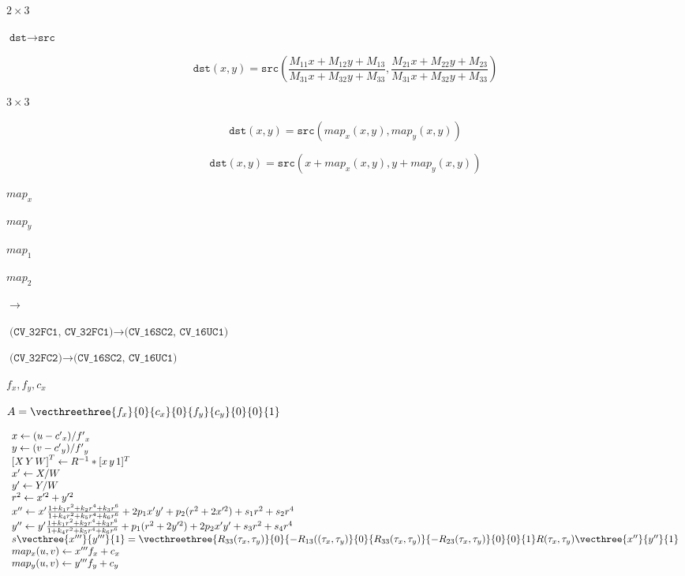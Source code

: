 \documentclass{article}
\begin{document}
$2\times 3$
\pagebreak

$\texttt{dst}\rightarrow\texttt{src}$
\pagebreak

\[\texttt{dst} (x,y) =  \texttt{src} \left ( \frac{M_{11} x + M_{12} y + M_{13}}{M_{31} x + M_{32} y + M_{33}} ,
     \frac{M_{21} x + M_{22} y + M_{23}}{M_{31} x + M_{32} y + M_{33}} \right )\]
\pagebreak

$3\times 3$
\pagebreak

\[\texttt{dst} (x,y) =  \texttt{src} (map_x(x,y),map_y(x,y))\]
\pagebreak

\[\texttt{dst} (x,y) =  \texttt{src} (x+map_x(x,y),y+map_y(x,y))\]
\pagebreak

$map_x$
\pagebreak

$map_y$
\pagebreak

$map_1$
\pagebreak

$map_2$
\pagebreak

$\rightarrow$
\pagebreak

$\texttt{(CV_32FC1, CV_32FC1)} \rightarrow \texttt{(CV_16SC2, CV_16UC1)}$
\pagebreak

$\texttt{(CV_32FC2)} \rightarrow \texttt{(CV_16SC2, CV_16UC1)}$
\pagebreak

$f_x,
f_y, c_x$
\pagebreak

$A = \vecthreethree{f_x}{0}{c_x}{0}{f_y}{c_y}{0}{0}{1}$
\pagebreak

\[\begin{array}{l}
x  \leftarrow (u - {c'}_x)/{f'}_x  \\
y  \leftarrow (v - {c'}_y)/{f'}_y  \\
{[X\,Y\,W]} ^T  \leftarrow R^{-1}*[x \, y \, 1]^T  \\
x'  \leftarrow X/W  \\
y'  \leftarrow Y/W  \\
r^2  \leftarrow x'^2 + y'^2 \\
x''  \leftarrow x' \frac{1 + k_1 r^2 + k_2 r^4 + k_3 r^6}{1 + k_4 r^2 + k_5 r^4 + k_6 r^6}
+ 2p_1 x' y' + p_2(r^2 + 2 x'^2)  + s_1 r^2 + s_2 r^4\\
y''  \leftarrow y' \frac{1 + k_1 r^2 + k_2 r^4 + k_3 r^6}{1 + k_4 r^2 + k_5 r^4 + k_6 r^6}
+ p_1 (r^2 + 2 y'^2) + 2 p_2 x' y' + s_3 r^2 + s_4 r^4 \\
s\vecthree{x'''}{y'''}{1} =
\vecthreethree{R_{33}(\tau_x, \tau_y)}{0}{-R_{13}((\tau_x, \tau_y)}
{0}{R_{33}(\tau_x, \tau_y)}{-R_{23}(\tau_x, \tau_y)}
{0}{0}{1} R(\tau_x, \tau_y) \vecthree{x''}{y''}{1}\\
map_x(u,v)  \leftarrow x''' f_x + c_x  \\
map_y(u,v)  \leftarrow y''' f_y + c_y
\end{array}
\]
\pagebreak
\end{document}
